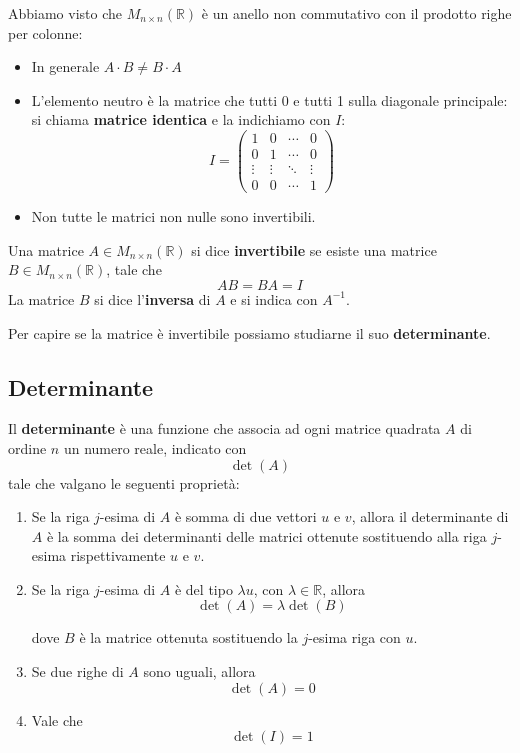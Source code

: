 \documentclass[
  a4paper,
]{article}
\providecommand{\tightlist}{%
  \setlength{\itemsep}{0pt}\setlength{\parskip}{0pt}}
\providecommand{\tightlist}{}
\begin{document}
Abbiamo visto che \(M_{n\times n}(\mathbb{R})\) è un anello non
commutativo con il prodotto righe per colonne:

\begin{itemize}
\tightlist
\item
  In generale \(A \cdot B \not = B \cdot A\)
\item
  L'elemento neutro è la matrice che tutti 0 e tutti 1 sulla diagonale
  principale: si chiama \textbf{matrice identica} e la indichiamo con
  \(I\): \[
  I =
  \begin{pmatrix}
  1 & 0 & \cdots & 0 \\
  0 & 1 & \cdots & 0 \\
  \vdots & \vdots & \ddots & \vdots \\
  0 & 0 & \cdots & 1
  \end{pmatrix}
  \]
\item
  Non tutte le matrici non nulle sono invertibili.
\end{itemize}

\begin{definitionbox}
Una matrice \(A \in M_{n\times n}(\mathbb{R})\) si dice
\textbf{invertibile} se esiste una matrice
\(B \in M_{n\times n}(\mathbb{R})\), tale che \[
AB = BA = I
\]La matrice \(B\) si dice l'\textbf{inversa} di \(A\) e si indica con
\(A^{-1}\).
\end{definitionbox}

Per capire se la matrice è invertibile possiamo studiarne il suo
\textbf{determinante}.

\hypertarget{determinante}{%
\subsection{Determinante}\label{determinante}}

\begin{definitionbox}
Il \textbf{determinante} è una funzione che associa ad ogni matrice
quadrata \(A\) di ordine \(n\) un numero reale, indicato con \[
\det(A)
\] tale che valgano le seguenti proprietà:

\begin{enumerate}
\def\labelenumi{\arabic{enumi}.}
\item
  Se la riga \(j\)-esima di \(A\) è somma di due vettori \(u\) e \(v\),
  allora il determinante di \(A\) è la somma dei determinanti delle
  matrici ottenute sostituendo alla riga \(j\)-esima rispettivamente
  \(u\) e \(v\).
\item
  Se la riga \(j\)-esima di \(A\) è del tipo \(\lambda u\), con
  \(\lambda \in \mathbb{R}\), allora \[
  \det(A) = \lambda \det(B)
  \]

  dove \(B\) è la matrice ottenuta sostituendo la \(j\)-esima riga con
  \(u\).
\item
  Se due righe di \(A\) sono uguali, allora \[
  \det(A)=0
  \]
\item
  Vale che \[
  \det(I)=1
  \]
\end{enumerate}
\end{definitionbox}
\end{document}
